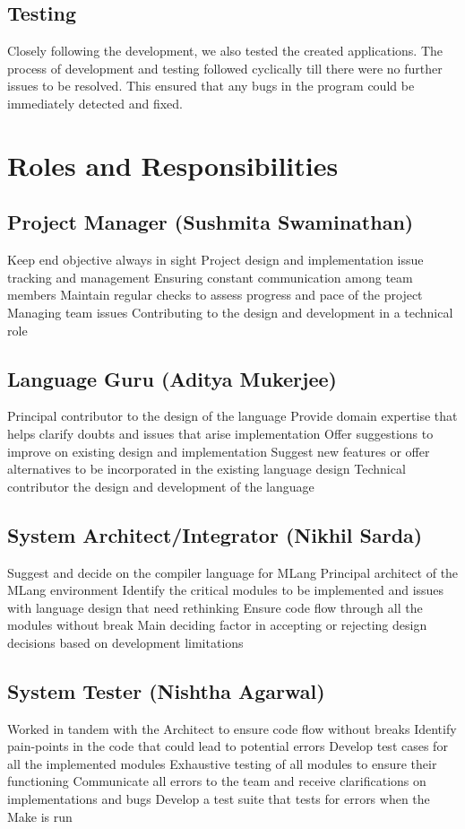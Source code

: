 \documentclass[letterpaper,11pt]{article}
\begin{document}
{ \subsection{Testing}
Closely following the development, we also tested the created applications.  The process of development and testing followed cyclically till there were no further issues to be resolved. This ensured that any bugs in the program could be immediately detected and fixed.



\section{Roles and Responsibilities}

\subsection{Project Manager (Sushmita Swaminathan)}
Keep end objective always in sight
Project design and implementation issue tracking and management
Ensuring constant communication among team members
Maintain regular checks to assess progress and pace of the project
Managing team issues
Contributing to the design and development in a technical role

\subsection{Language Guru (Aditya Mukerjee)}
Principal contributor to the design of the language
Provide domain expertise that helps clarify doubts and issues that arise implementation
Offer suggestions to improve on existing design and implementation
Suggest new features or offer alternatives to be incorporated in the existing language design
Technical contributor the design and development of the language

\subsection{System Architect/Integrator (Nikhil Sarda)}
Suggest and decide on the compiler language for MLang
Principal architect of the MLang environment
Identify the critical modules to be implemented and issues with language design that need rethinking
Ensure code flow through all the modules without break
Main deciding factor in accepting or rejecting design decisions based on development limitations

\subsection{System Tester (Nishtha Agarwal)}
Worked in tandem with the Architect to ensure code flow without breaks
Identify pain-points in the code that could lead to potential errors
Develop test cases for all the implemented modules
Exhaustive testing of all modules to ensure their functioning
Communicate all errors to the team and receive clarifications on implementations and bugs
Develop a test suite that tests for errors when the Make is run

}
\end{document}
